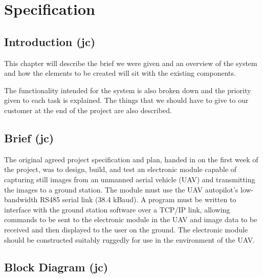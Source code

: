 
\chapter{Specification}
\label{chap:specification}

\section{Introduction (jc)}

This chapter will describe the brief we were given and an overview of the system and how the elements to be created will sit with the existing components.

The functionality intended for the system is also broken down and the priority given to each task is explained. The things that we should have to give to our customer at the end of the project are also described.

\section{Brief (jc)}

The original agreed project specification and plan, handed in on the first week of the project, was to design, build, and test an electronic module capable of capturing still images from an unmanned aerial vehicle (UAV) and transmitting the images to a ground station. The module must use the UAV autopilot’s low-bandwidth RS485 serial link (38.4 kBaud). A program must be written to interface with the ground station software over a TCP/IP link, allowing commands to be sent to the electronic module in the UAV and image data to be received and then displayed to the user on the ground. The electronic module should be constructed suitably ruggedly for use in the environment of the UAV.

\section{Block Diagram (jc)}


